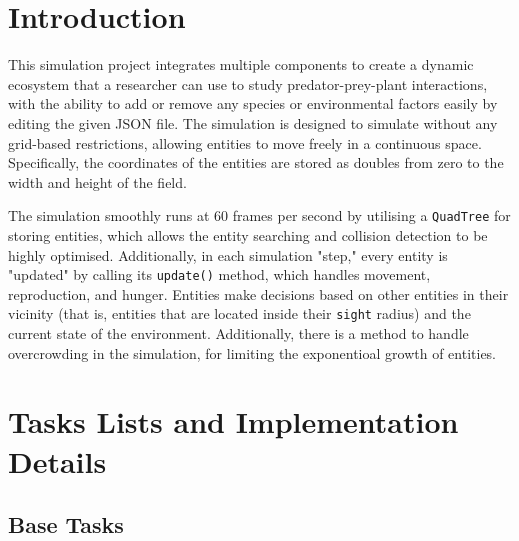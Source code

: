 \documentclass[12pt, a4paper]{scrartcl}
\begin{document}
\begin{multicols}{2}


\section{Introduction}

\noindent This simulation project integrates multiple components to create a dynamic ecosystem that a researcher can use to
study predator-prey-plant interactions, with the ability to add or remove any species or environmental factors easily
by editing the given JSON file.
The simulation is designed to simulate without any grid-based restrictions, allowing entities to move freely in a
continuous space. Specifically, the coordinates of the entities are stored as doubles from zero to the width and height
of the field.

\noindent The simulation smoothly runs at 60 frames per second by utilising a \verb|QuadTree| for storing entities, which
allows the entity searching and collision detection to be highly optimised. Additionally, in each simulation "step,"
every entity is "updated" by calling its \verb|update()| method, which handles movement, reproduction, and hunger.
Entities make decisions based on other entities in their vicinity (that is, entities that are located inside their
\verb|sight| radius) and the current state of the environment. Additionally, there is a
method to handle overcrowding in the simulation, for limiting the exponentioal growth of entities.

\section{Tasks Lists and Implementation Details}

\subsection{Base Tasks}


\end{multicols}
\end{document}
